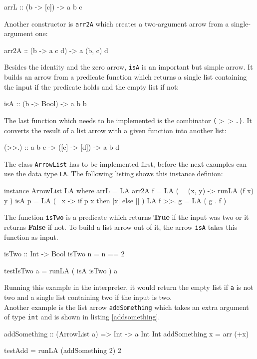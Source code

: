 \documentclass[11pt,a4paper,headsepline, bibtotoc]{scrreprt}
\begin{document}
\begin{code}
arrL :: (b -> [c]) -> a b c
\end{code}
Another constructor is \texttt{arr2A} which creates a two-argument arrow from a single-argument one:
\begin{code}
arr2A :: (b -> a c d) -> a (b, c) d
\end{code}
Besides the identity and the zero arrow, \texttt{isA} is an important but simple arrow. It builds an arrow from a predicate function which returns a single list containing the input if the predicate holds and the empty list if not:  
\begin{code}
isA  :: (b -> Bool) -> a b b
\end{code}
The last function which needs to be implemented is the combinator \texttt{($>$$>$.)}. It converts the result of a list arrow with a given function into another list:
\begin{code}
(>>.) :: a b c -> ([c] -> [d]) -> a b d
\end{code}
The class \texttt{ArrowList} has to be implemented first, before the next examples can use the data type \texttt{LA}. The following listing shows this instance definion:
\begin{code}
instance ArrowList LA where
  arrL       = LA
  arr2A f    = LA ( \ ~(x, y) -> runLA (f x) y )
  isA p      = LA ( \ x -> if p x then [x] else [] )
  LA f >>. g = LA ( g . f )
\end{code}
The function \texttt{isTwo} is a predicate which returns \textbf{True} if the input was two or it returns \textbf{False} if not. To build a list arrow out of it, the arrow \texttt{isA} takes this function as input.
\begin{code}[caption=Example Predicate]
isTwo :: Int -> Bool
isTwo n = n == 2

testIsTwo a = runLA ( isA isTwo ) a
\end{code}
Running this example in the interpreter, it would return the empty list if \texttt{a} is not two and a single list containing two if the input is two.\\
Another example is the list arrow \texttt{addSomething} which takes an extra argument of type \texttt{int} and is shown in listing \ref{addsomething}.
\begin{code}[caption=Arrow with Extra Parameter, label=addsomething]
addSomething :: (ArrowList a) => Int -> a Int Int
addSomething x = arr (+x)

testAdd = runLA (addSomething 2) 2
\end{code}
\end{document}
